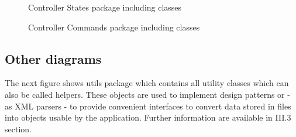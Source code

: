 \documentclass[paper=a4,fontsize=11pt]{report}
\numberwithin{equation}{section}		%
\numberwithin{figure}{section}		%
\numberwithin{table}{section}		%
\begin{document}
\begin{figure}[H]
\noindent{}
\caption{Controller States package including classes}
\end{figure}

\begin{figure}[H]
\centering
\noindent{}
\caption{Controller Commands package including classes}
\end{figure}

\subsection{Other diagrams}
\label{subsec:other-diagrams}

The next figure shows utils package which contains all utility classes which can also be called helpers. These objects are used to implement design patterns or - as XML parsers - to provide convenient interfaces to convert data stored in files into objects usable by the application. Further information are available in III.3 section.
\end{document}
